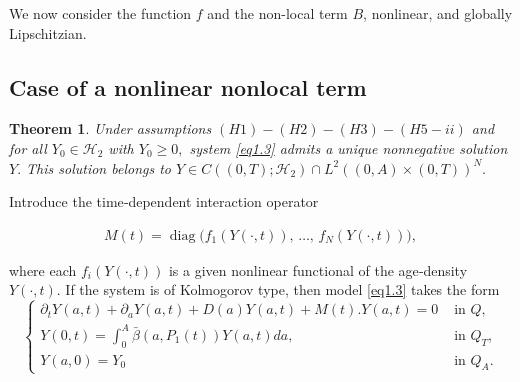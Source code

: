 \documentclass[10pt, a4paper]{amsart}
\newcounter{assu}
\theoremstyle{plain}
\newtheorem{theorem}[lemma]{Theorem}
\theoremstyle{definition}
\theoremstyle{remark}
\newtheorem{remark}[lemma]{Remark}
\numberwithin{equation}{section}
\begin{document}
 We now consider the function $f$ and the non-local term $B$, nonlinear, and globally Lipschitzian.
\subsection{Case of a nonlinear nonlocal term}%
\begin{theorem}\label{th2.7}
 Under assumptions $(H1)-(H2)-(H3)-(H5-ii)$ and for all $Y_0\in \mathcal{H}_2$ with $Y_0\geq 0,$ system \eqref{eq1.3} admits a unique nonnegative solution $Y.$ This solution belongs to $Y\in  C((0,T) ; \mathcal{H}_2)\cap L^2((0,A)\times(0,T))^N.$ 
\end{theorem}
Introduce the time‑dependent interaction operator

\begin{align}
M(t) =\operatorname{diag}\bigl(f_1(Y(\cdot,t)),\,\dots,\,f_N(Y(\cdot,t))\bigr),
\end{align}

 where each $f_i(Y(\cdot,t))$ is a given nonlinear functional of the age‑density $Y(\cdot,t)$.  If the system is of Kolmogorov type, then model \eqref{eq1.3} takes the form%
\begin{equation}\label{eq2.24}
\left\lbrace 
\begin{array}{ll}
\partial_tY(a,t)+\partial_aY(a,t)+D(a)Y(a,t)+M(t).Y(a,t)=0 &\text{ in }Q,\\  
Y(0,t)=\displaystyle\int_0^A\bar{\beta}(a,P_1(t))Y(a,t)da, &\text{ in } Q_T,\\
Y(a,0)=Y_0 &\text{ in } Q_A.
\end{array}
\right.
\end{equation} 
\end{document}
